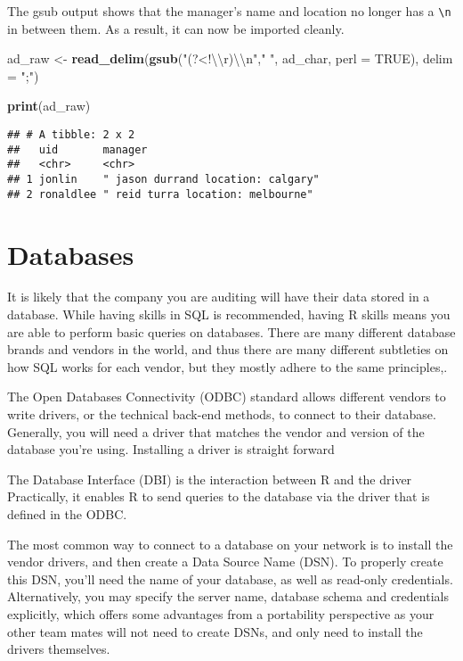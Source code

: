 \documentclass[
]{book}
\newenvironment{Shaded}{\begin{snugshade}}{\end{snugshade}}
\newcommand{\CharTok}[1]{\textcolor[rgb]{0.31,0.60,0.02}{#1}}
\newcommand{\DataTypeTok}[1]{\textcolor[rgb]{0.13,0.29,0.53}{#1}}
\newcommand{\KeywordTok}[1]{\textcolor[rgb]{0.13,0.29,0.53}{\textbf{#1}}}
\newcommand{\NormalTok}[1]{#1}
\newcommand{\OtherTok}[1]{\textcolor[rgb]{0.56,0.35,0.01}{#1}}
\newcommand{\StringTok}[1]{\textcolor[rgb]{0.31,0.60,0.02}{#1}}
\begin{document}
The gsub output shows that the manager's name and location no longer has a \texttt{\textbackslash{}n} in between them. As a result, it can now be imported cleanly.

\begin{Shaded}
\begin{Highlighting}[]
\NormalTok{ad_raw <-}\StringTok{ }\KeywordTok{read_delim}\NormalTok{(}\KeywordTok{gsub}\NormalTok{(}\StringTok{"(?<!}\CharTok{\textbackslash{}\textbackslash{}}\StringTok{r)}\CharTok{\textbackslash{}\textbackslash{}}\StringTok{n"}\NormalTok{,}\StringTok{" "}\NormalTok{, ad_char, }\DataTypeTok{perl =} \OtherTok{TRUE}\NormalTok{), }\DataTypeTok{delim =} \StringTok{";"}\NormalTok{)}

\KeywordTok{print}\NormalTok{(ad_raw)}
\end{Highlighting}
\end{Shaded}

\begin{verbatim}
## # A tibble: 2 x 2
##   uid       manager                           
##   <chr>     <chr>                             
## 1 jonlin    " jason durrand location: calgary"
## 2 ronaldlee " reid turra location: melbourne"
\end{verbatim}

\hypertarget{databases}{%
\section{Databases}\label{databases}}

It is likely that the company you are auditing will have their data stored in a database. While having skills in SQL is recommended, having R skills means you are able to perform basic queries on databases. There are many different database brands and vendors in the world, and thus there are many different subtleties on how SQL works for each vendor, but they mostly adhere to the same principles,.

The Open Databases Connectivity (ODBC) standard allows different vendors to write drivers, or the technical back-end methods, to connect to their database. Generally, you will need a driver that matches the vendor and version of the database you're using. Installing a driver is straight forward

The Database Interface (DBI) is the interaction between R and the driver Practically, it enables R to send queries to the database via the driver that is defined in the ODBC.

The most common way to connect to a database on your network is to install the vendor drivers, and then create a Data Source Name (DSN). To properly create this DSN, you'll need the name of your database, as well as read-only credentials. Alternatively, you may specify the server name, database schema and credentials explicitly, which offers some advantages from a portability perspective as your other team mates will not need to create DSNs, and only need to install the drivers themselves.
\end{document}
